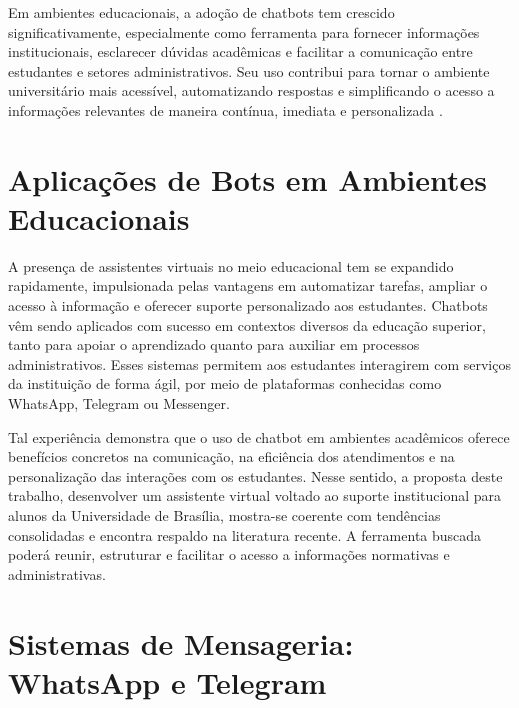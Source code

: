 Em ambientes educacionais, a adoção de chatbots tem crescido significativamente, especialmente como ferramenta para fornecer informações institucionais, esclarecer dúvidas acadêmicas e facilitar a comunicação entre estudantes e setores administrativos. Seu uso contribui para tornar o ambiente universitário mais acessível, automatizando respostas e simplificando o acesso a informações relevantes de maneira contínua, imediata e personalizada \cite{dykeland2018unleashing}.

\section{Aplicações de Bots em Ambientes Educacionais}

A presença de assistentes virtuais no meio educacional tem se expandido rapidamente, impulsionada pelas vantagens em automatizar tarefas, ampliar o acesso à informação e oferecer suporte personalizado aos estudantes. Chatbots vêm sendo aplicados com sucesso em contextos diversos da educação superior, tanto para apoiar o aprendizado quanto para auxiliar em processos administrativos. Esses sistemas permitem aos estudantes interagirem com serviços da instituição de forma ágil, por meio de plataformas conhecidas como WhatsApp, Telegram ou Messenger.


Tal experiência demonstra que o uso de chatbot em ambientes acadêmicos oferece benefícios concretos na comunicação, na eficiência dos atendimentos e na personalização das interações com os estudantes. Nesse sentido, a proposta deste trabalho, desenvolver um assistente virtual voltado ao suporte institucional para alunos da Universidade de Brasília, mostra-se coerente com tendências consolidadas e encontra respaldo na literatura recente. A ferramenta buscada poderá reunir, estruturar e facilitar o acesso a informações normativas e administrativas.

\section{Sistemas de Mensageria: WhatsApp e Telegram}

